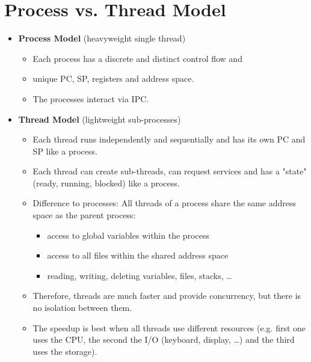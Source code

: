     \section{Process vs. Thread Model}
	    \begin{itemize}
	    	\item \textbf{Process Model} (heavyweight single thread)
		    	\begin{itemize}
		    		\item Each process has a discrete and distinct control flow and
		    		\item unique PC, SP, registers and address space.
		    		\item The processes interact via IPC.
		    	\end{itemize}
	    	\item \textbf{Thread Model} (lightweight sub-processes)
		    	\begin{itemize}
		    		\item Each thread runs independently and sequentially and has its own PC and SP like a process.
		    		\item Each thread can create sub-threads, can request services and has a "state" (ready, running, blocked) like a process.
		    		\item Difference to processes: All threads of a process share the same address space as the parent process:
			    		\begin{itemize}
			    			\item access to global variables within the process
			    			\item access to all files within the shared address space
			    			\item reading, writing, deleting variables, files, stacks, \dots
			    		\end{itemize}
		    		\item Therefore, threads are much faster and provide concurrency, but there is no isolation between them.
		    		\item The speedup is best when all threads use different resources (e.g. first one uses the CPU, the second the I/O (keyboard, display, \dots) and the third uses the storage).
		    	\end{itemize}
	    \end{itemize}

